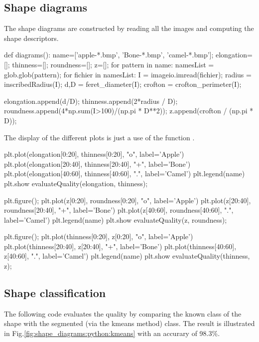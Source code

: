 \subsection{Shape diagrams}
The shape diagrams are constructed by reading all the images and computing the shape descriptors.
\begin{python}
def diagrams():
    name=['apple-*.bmp', 'Bone-*.bmp', 'camel-*.bmp'];
    elongation=[];
    thinness=[];
    roundness=[];
    z=[];
    for pattern in name:
        namesList = glob.glob(pattern);
        for fichier in namesList:
            I = imageio.imread(fichier);
            radius = inscribedRadius(I);
            d,D = feret_diameter(I);
            crofton = crofton_perimeter(I);
            
            elongation.append(d/D);
            thinness.append(2*radius / D);
            roundness.append(4*np.sum(I>100)/(np.pi * D**2));
            z.append(crofton / (np.pi * D));
\end{python}
    
The display of the different plots is just a use of the function .
\begin{python}
    plt.plot(elongation[0:20], thinness[0:20], "o", label='Apple')
    plt.plot(elongation[20:40], thinness[20:40], "+", label='Bone')
    plt.plot(elongation[40:60], thinness[40:60], ".", label='Camel')
    plt.legend(name)
    plt.show
    evaluateQuality(elongation, thinness);
    
    plt.figure();
    plt.plot(z[0:20], roundness[0:20], "o", label='Apple')
    plt.plot(z[20:40], roundness[20:40], "+", label='Bone')
    plt.plot(z[40:60], roundness[40:60], ".", label='Camel')
    plt.legend(name)
    plt.show
    evaluateQuality(z, roundness);
    
    plt.figure();
    plt.plot(thinness[0:20], z[0:20], "o", label='Apple')
    plt.plot(thinness[20:40], z[20:40], "+", label='Bone')
    plt.plot(thinness[40:60], z[40:60], ".", label='Camel')
    plt.legend(name)
    plt.show
    evaluateQuality(thinness, z);
\end{python}

\vspace*{-10pt}

\subsection{Shape classification}

The following code evaluates the quality by comparing the known class of the shape with the segmented (via the kmeans method) class. The result is illustrated in Fig.\ref{fig:shape_diagrams:python:kmeans} with an accurary of 98.3\%.

